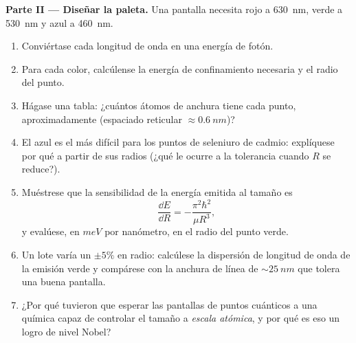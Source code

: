 \begin{problem}
\medskip\noindent\textbf{Parte II --- Diseñar la paleta.}
Una pantalla necesita rojo a \qty{630}{nm}, verde a \qty{530}{nm} y azul a
\qty{460}{nm}.
\begin{enumerate}[resume]
  \item Conviértase cada longitud de onda en una energía de fotón.
  \item Para cada color, calcúlense la energía de confinamiento necesaria y
        el radio del punto.
  \item Hágase una tabla: ¿cuántos átomos de anchura tiene cada punto,
        aproximadamente (espaciado reticular $\approx \qty{0.6}{nm}$)?
  \item El azul es el más difícil para los puntos de seleniuro de cadmio:
        explíquese por qué a partir de sus radios (¿qué le ocurre a la
        tolerancia cuando $R$ se reduce?).
  \item Muéstrese que la sensibilidad de la energía emitida al tamaño es
        \[
        \frac{\dd E}{\dd R} = -\frac{\pi^2\hbar^2}{\mu R^3} ,
        \]
        y evalúese, en $\unit{meV}$ por nanómetro, en el radio del punto
        verde.
  \item Un lote varía un $\pm5\%$ en radio: calcúlese la dispersión de
        longitud de onda de la emisión verde y compárese con la anchura de
        línea de $\sim\qty{25}{nm}$ que tolera una buena pantalla.
  \item ¿Por qué tuvieron que esperar las pantallas de puntos cuánticos a
        una química capaz de controlar el tamaño a \emph{escala atómica}, y
        por qué es eso un logro de nivel Nobel?
\end{enumerate}


\end{problem}
